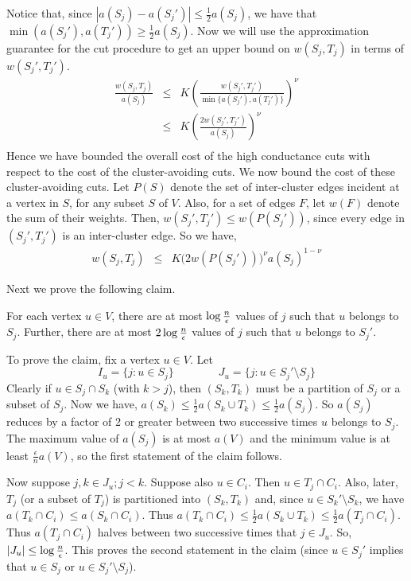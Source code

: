 \documentclass{book}
\numberwithin{exercise}{chapter}
\begin{document}
Notice that, since $|a(S_j)-a(S_j')|\leq \frac{1}{2} a(S_j)$, we have
that $\min ( a(S_j'),a(T_j'))\geq \frac{1}{2} a(S_j)$.
Now we will use the approximation guarantee for the cut procedure
to get an upper bound on $w(S_j,T_j)$
in terms of $w(S_j',T_j')$.
\begin{eqnarray*}
\frac{w(S_j,T_j)}{a(S_j)} &\leq&  K \left(\frac{w(S_j',T_j')}{\min \{a(S_j'),a(T_j')\}}\right)^\nu\\
& \leq & K \left(\frac{2w(S_j',T_j')}{a(S_j)}\right)^\nu\\
\end{eqnarray*}
Hence we have bounded the overall cost of the high conductance cuts with respect to
the cost of the cluster-avoiding cuts. We now bound the cost of these
cluster-avoiding cuts. Let $P(S)$ denote the set of inter-cluster
edges incident at a vertex in $S$, for any subset $S$ of $V$.
Also, for a set of edges $F$, let $w(F)$ denote the sum of their weights.
Then, $w(S_j',T_j')\leq w(P(S_j'))$, since every edge in $(S_j',T_j')$ is an
inter-cluster edge. So we have,
\begin{eqnarray}
w(S_j,T_j) & \leq & K \big(2 w(P(S_j'))\big)^\nu a(S_j)^{1-\nu} \label{wsj2}
\end{eqnarray}

Next we prove the following claim.

 For each vertex $u\in V$, there are at most $\log \frac{n}{\epsilon}$
values of $j$ such that $u$ belongs to $S_j$. Further, there are at most
$2\log \frac{n}{\epsilon}$ values of $j$ such that $u$ belongs to $S_j'$.

To prove the claim, fix a vertex $u\in V$. Let
$$I_u=\{ j : u\in S_j\}\qquad\qquad J_u=\{ j : u \in S_j'\setminus S_j\}$$
Clearly if $u\in S_j\cap S_k$ (with $k>j$), then $(S_k,T_k)$ must be a partition
of $S_j$ or a subset of $S_j$. Now we have,
$a(S_k)\leq \frac{1}{2} a(S_k\cup T_k)\leq \frac{1}{2} a(S_j)$.
So $a(S_j)$ reduces by a factor of 2 or greater between two
successive times $u$ belongs to $S_j$. The maximum value of
$a(S_j)$ is at most $a(V)$ and the minimum value is at least
$\frac{\epsilon}{n} a(V)$, so the first statement of the claim follows.

Now suppose $j,k\in J_u; j < k$. Suppose also $u\in C_i$. Then
$u\in T_j\cap C_i$.  Also, later,
$T_j$ (or a subset of $T_j$) is partitioned into $(S_k,T_k)$
and, since $u\in S_k'\setminus S_k$, we have $a(T_k\cap C_i)
\leq a(S_k\cap C_i)$.
Thus $a(T_k\cap C_i)
\leq \frac{1}{2}a( S_k\cup T_k)\leq \frac{1}{2}a(T_j\cap C_i)$.
Thus $a(T_j\cap C_i)$
halves between two successive
times that $j\in J_u$. So, $|J_u|\leq \log \frac{n}{\epsilon}$.
This proves the second statement in the claim (since $u\in S_j'$ implies that
$u\in S_j$ or $u\in S_j'\setminus S_j$).
\end{document}
